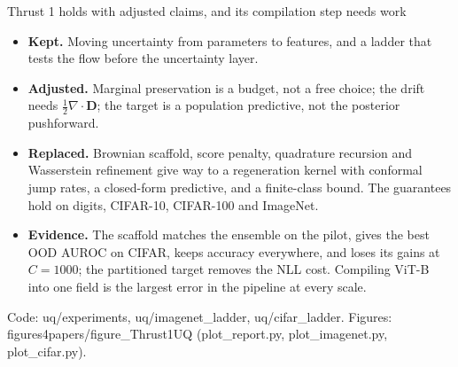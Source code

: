 \documentclass[aspectratio=169,11pt]{beamer}
\newcommand{\D}{\bm{D}}
\newcommand{\source}[1]{\par\vfill{\scriptsize\color{inkgrey}#1}}
\begin{document}
\begin{frame}{Thrust 1 holds with adjusted claims, and its compilation step needs work}
  \small
  \begin{itemize}
    \item \textbf{Kept.} Moving uncertainty from parameters to features, and a ladder that tests the flow before the uncertainty layer.
    \item \textbf{Adjusted.} Marginal preservation is a budget, not a free choice; the drift needs $\frac12\nabla\!\cdot\!\D$; the target is a population predictive, not the posterior pushforward.
    \item \textbf{Replaced.} Brownian scaffold, score penalty, quadrature recursion and Wasserstein refinement give way to a regeneration kernel with conformal jump rates, a closed-form predictive, and a finite-class bound. The guarantees hold on digits, CIFAR-10, CIFAR-100 and ImageNet.
    \item \textbf{Evidence.} The scaffold matches the ensemble on the pilot, gives the best OOD AUROC on CIFAR, keeps accuracy everywhere, and loses its gains at $C=1000$; the partitioned target removes the NLL cost. Compiling ViT-B into one field is the largest error in the pipeline at every scale.
  \end{itemize}
  \source{Code: uq/experiments, uq/imagenet\_ladder, uq/cifar\_ladder. Figures: figures4papers/figure\_Thrust1UQ (plot\_report.py, plot\_imagenet.py, plot\_cifar.py).}
\end{frame}
\end{document}

